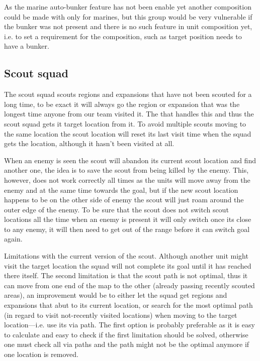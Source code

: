 As the marine auto-bunker feature has not been enable yet another composition could be made with only for marines, but this group would be very vulnerable if the bunker was not present and there is no such feature in unit composition yet, i.e. to set a requirement for the composition, such as target position needs to have a bunker.

\subsection{Scout squad}
\label{sec:scout_squad}
The scout squad scouts regions and expansions that have not been scouted for a long time, to be exact it will always go the region or expansion that was the longest time anyone from our team visited it. The  that handles this and thus the scout squad gets it target location from it. To avoid multiple scouts moving to the same location the scout location will reset its last visit time when the squad gets the location, although it hasn't been visited at all.

When an enemy is seen the scout will abandon its current scout location and find another one, the idea is to save the scout from being killed by the enemy. This, however, does not work correctly all times as the units will move away from the enemy and at the same time towards the goal, but if the new scout location happens to be on the other side of enemy the scout will just roam around the outer edge of the enemy. To be sure that the scout does not switch scout locations all the time when an enemy is present it will only switch once its close to any enemy, it will then need to get out of the range before it can switch goal again.

Limitations with the current version of the scout. Although another unit might visit the target location the squad will not complete its goal until it has reached there itself. The second limitation is that the scout path is not optimal, thus it can move from one end of the map to the other (already passing recently scouted areas), an improvement would be to either let the squad get regions and expansions that abut to its current location, or search for the most optimal path (in regard to visit not-recently visited locations) when moving to the target location—i.e. use its via path. The first option is probably preferable as it is easy to calculate and easy to check if the first limitation should be solved, otherwise one must check all via paths and the path might not be the optimal anymore if one location is removed.

